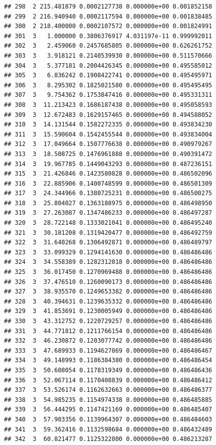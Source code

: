 \documentclass[article]{jss}\usepackage[]{graphicx}\usepackage[]{xcolor}
\makeatletter
\newenvironment{kframe}{%
 \def\at@end@of@kframe{}%
 \ifinner\ifhmode%
  \def\at@end@of@kframe{\end{minipage}}%
  \begin{minipage}{\columnwidth}%
 \fi\fi%
 \def\FrameCommand##1{\hskip\@totalleftmargin \hskip-\fboxsep
 \colorbox{shadecolor}{##1}\hskip-\fboxsep
     \hskip-\linewidth \hskip-\@totalleftmargin \hskip\columnwidth}%
 \MakeFramed {\advance\hsize-\width
   \@totalleftmargin\z@ \linewidth\hsize
   \@setminipage}}%
 {\par\unskip\endMakeFramed%
 \at@end@of@kframe}
\newenvironment{knitrout}{}{} %
\makeatother
\begin{document}
\begin{knitrout}
\begin{kframe}
\begin{verbatim}
## 298  2 215.481879 0.0002127738 0.000000e+00 0.001852158
## 299  2 216.940940 0.0002117594 0.000000e+00 0.001838485
## 300  2 218.400000 0.0002107572 0.000000e+00 0.001824991
## 301  3   1.000000 0.3806376917 4.031197e-11 0.999992011
## 302  3   2.459060 0.2457685805 0.000000e+00 0.626261752
## 303  3   3.918121 0.2140539930 0.000000e+00 0.511570666
## 304  3   5.377181 0.2004426345 0.000000e+00 0.495585012
## 305  3   6.836242 0.1908422741 0.000000e+00 0.495495971
## 306  3   8.295302 0.1825021580 0.000000e+00 0.495495495
## 307  3   9.754362 0.1753847416 0.000000e+00 0.495331311
## 308  3  11.213423 0.1686187438 0.000000e+00 0.495058593
## 309  3  12.672483 0.1629157465 0.000000e+00 0.494588052
## 310  3  14.131544 0.1582272335 0.000000e+00 0.493834230
## 311  3  15.590604 0.1542455544 0.000000e+00 0.493834004
## 312  3  17.049664 0.1507776638 0.000000e+00 0.490979267
## 313  3  18.508725 0.1476961888 0.000000e+00 0.490391472
## 314  3  19.967785 0.1449043293 0.000000e+00 0.487236151
## 315  3  21.426846 0.1423580828 0.000000e+00 0.486502096
## 316  3  22.885906 0.1400748599 0.000000e+00 0.486501309
## 317  3  24.344966 0.1380725231 0.000000e+00 0.486500275
## 318  3  25.804027 0.1363188975 0.000000e+00 0.486498950
## 319  3  27.263087 0.1347486233 0.000000e+00 0.486497287
## 320  3  28.722148 0.1333021041 0.000000e+00 0.486495240
## 321  3  30.181208 0.1319420477 0.000000e+00 0.486492759
## 322  3  31.640268 0.1306492871 0.000000e+00 0.486489797
## 323  3  33.099329 0.1294141630 0.000000e+00 0.486486486
## 324  3  34.558389 0.1282312018 0.000000e+00 0.486486486
## 325  3  36.017450 0.1270969488 0.000000e+00 0.486486486
## 326  3  37.476510 0.1260090173 0.000000e+00 0.486486486
## 327  3  38.935570 0.1249653382 0.000000e+00 0.486486486
## 328  3  40.394631 0.1239635332 0.000000e+00 0.486486486
## 329  3  41.853691 0.1230005949 0.000000e+00 0.486486486
## 330  3  43.312752 0.1220729257 0.000000e+00 0.486486486
## 331  3  44.771812 0.1211766154 0.000000e+00 0.486486486
## 332  3  46.230872 0.1203077742 0.000000e+00 0.486486486
## 333  3  47.689933 0.1194627869 0.000000e+00 0.486486467
## 334  3  49.148993 0.1186384380 0.000000e+00 0.486486454
## 335  3  50.608054 0.1178319349 0.000000e+00 0.486486436
## 336  3  52.067114 0.1170408839 0.000000e+00 0.486486412
## 337  3  53.526174 0.1162632663 0.000000e+00 0.486486377
## 338  3  54.985235 0.1154974338 0.000000e+00 0.486485885
## 339  3  56.444295 0.1147421169 0.000000e+00 0.486485407
## 340  3  57.903356 0.1139964307 0.000000e+00 0.486484603
## 341  3  59.362416 0.1132598684 0.000000e+00 0.486432489
## 342  3  60.821477 0.1125322800 0.000000e+00 0.486213287

\end{verbatim}
\end{kframe}
\end{knitrout}
\end{document}
